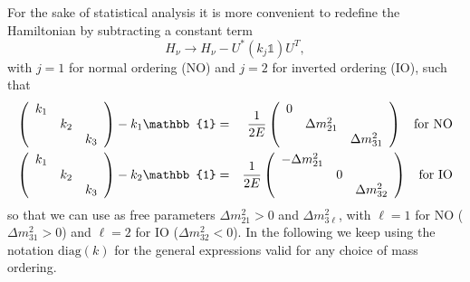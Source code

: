 \documentclass{article}
\begin{document}
For the sake of statistical analysis it is more convenient to redefine the Hamiltonian by subtracting a constant term
\begin{equation}
	H_\nu \rightarrow H_\nu - U^* \left(k_j \mathbb{1}\right) U^T,
\end{equation}
with $j=1$ for normal ordering (NO) and $j=2$ for inverted ordering (IO), such that
\begin{eqnarray}
	\left(\begin{array}{ccc}
k_1 &&\\
& k_2 & \\
&& k_3 	
\end{array} \right) - k_1 \mathbb{1} &=& \frac{1}{2E} \left( \begin{array}{ccc}
 0 && \\
 & \Delta m_{21}^2 & \\
 && \Delta m_{31}^2	
 \end{array} \right) \hspace{0.2cm} \text{ for NO} \\
	\left(\begin{array}{ccc}
k_1 &&\\
& k_2 & \\
&& k_3 	
\end{array} \right) - k_2 \mathbb{1} &=& \frac{1}{2E} \left( \begin{array}{ccc}
 - \Delta m_{21}^2 && \\
 & 0 & \\
 && \Delta m_{32}^2	
 \end{array} \right) \hspace{0.2cm} \text{ for IO}
\end{eqnarray}
so that we can use as free parameters $\Delta m_{21}^2 >0$ and $\Delta m_{3\ell}^2$, with $\ell=1$ for NO ($\Delta m_{31}^2 > 0$) and $\ell=2$ for IO ($\Delta m_{32}^2 < 0$). In the following we keep using the notation $\text{diag}(k)$ for the general expressions valid for any choice of mass ordering.
\end{document}
